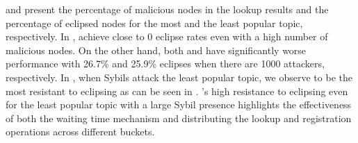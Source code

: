 %
%

 and  present the percentage of malicious nodes in the lookup results and the percentage of eclipsed nodes for the most and the least popular topic, respectively.%
In , \discv \sysname achieve close to $0$ eclipse rates even with a high number of malicious nodes. On the other hand, both \altname and \altnameticket have significantly worse performance with 26.7\% and 25.9\% eclipses when there are 1000 attackers, respectively.
In , 
when Sybils attack the least popular topic, we observe \sysname to be the most resistant to eclipsing as can be seen in . \sysname's high resistance to eclipsing even for the least popular topic with a large Sybil presence highlights the effectiveness of both the waiting time mechanism and distributing the lookup and registration operations across different buckets.
 
